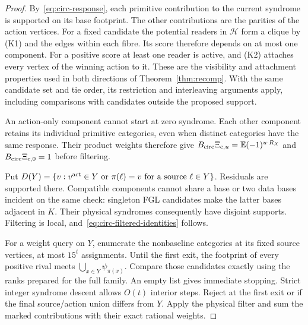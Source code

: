 \documentclass[10pt,twocolumn]{article}
\theoremstyle{definition}
\begin{document}
\begin{proof}
By~\eqref{eq:circ-response}, each primitive contribution to the
current syndrome is supported on its base footprint. The other
contributions are the parities of the action vertices. For a fixed
candidate the potential readers in $\mathcal H$ form a clique by
(K1) and the edges within each fibre. Its score therefore depends on
at most one component. For a positive score at least one reader is
active, and (K2) attaches every vertex of the winning action to it.
These are the visibility and attachment properties used in both
directions of Theorem~\ref{thm:recomp}. With the same candidate set
and tie order, its restriction and interleaving arguments apply,
including comparisons with candidates outside the proposed support.

An action-only component cannot start at zero syndrome. Each other
component retains its individual primitive categories, even when
distinct categories have the same response. Their product weights
therefore give $B_{\rm circ}\Xi_{{\rm c},u}=\mathbb E(-1)^{u\cdot R_X}$
and $B_{\rm circ}\Xi_{{\rm c},0}=1$ before filtering.

Put $D(Y)=\{v:v^{\rm act}\in Y\text{ or }\pi(\ell)=v
\text{ for a source }\ell\in Y\}$. Residuals are supported there.
Compatible components cannot share a base or two data bases incident on
the same check: singleton FGL candidates make the latter bases adjacent
in $K$. Their physical syndromes consequently have disjoint supports.
Filtering is local, and~\eqref{eq:circ-filtered-identities} follows.

For a weight query on $Y$, enumerate the nonbaseline categories at its
fixed source vertices, at most $15^t$ assignments. Until the first exit,
the footprint of every positive rival meets $\bigcup_{x\in Y}\psi_{\pi(x)}$. Compare
those candidates exactly using the ranks prepared for the full family.
An empty list gives immediate stopping. Strict integer syndrome descent
allows $O(t)$ interior steps. Reject at the first exit or if the final
source/action union differs from $Y$. Apply the physical filter and
sum the marked contributions with their exact rational weights.
\end{proof}
\end{document}
